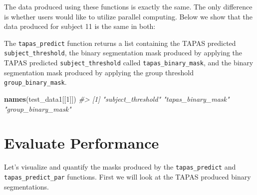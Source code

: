 \documentclass[]{article}
\newenvironment{Shaded}{\begin{snugshade}}{\end{snugshade}}
\newcommand{\CommentTok}[1]{\textcolor[rgb]{0.56,0.35,0.01}{\textit{#1}}}
\newcommand{\DecValTok}[1]{\textcolor[rgb]{0.00,0.00,0.81}{#1}}
\newcommand{\KeywordTok}[1]{\textcolor[rgb]{0.13,0.29,0.53}{\textbf{#1}}}
\newcommand{\NormalTok}[1]{#1}
\newcommand{\OperatorTok}[1]{\textcolor[rgb]{0.81,0.36,0.00}{\textbf{#1}}}
\begin{document}
The data produced using these functions is exactly the same. The only
difference is whether users would like to utilize parallel computing.
Below we show that the data produced for subject 11 is the same in both:

\begin{Shaded}
\end{Shaded}

The \texttt{tapas\_predict} function returns a list containing the TAPAS
predicted \texttt{subject\_threshold}, the binary segmentation mask
produced by applying the TAPAS predicted \texttt{subject\_threshold}
called \texttt{tapas\_binary\_mask}, and the binary segmentation mask
produced by applying the group threshold \texttt{group\_binary\_mask}.

\begin{Shaded}
\begin{Highlighting}[]
\KeywordTok{names}\NormalTok{(test_data1[[}\DecValTok{1}\NormalTok{]])}
\CommentTok{#> [1] "subject_threshold" "tapas_binary_mask" "group_binary_mask"}
\end{Highlighting}
\end{Shaded}

\hypertarget{evaluate-performance}{%
\section{Evaluate Performance}\label{evaluate-performance}}

Let's visualize and quantify the masks produced by the
\texttt{tapas\_predict} and \texttt{tapas\_predict\_par} functions.
First we will look at the TAPAS produced binary segmentations.
\end{document}
